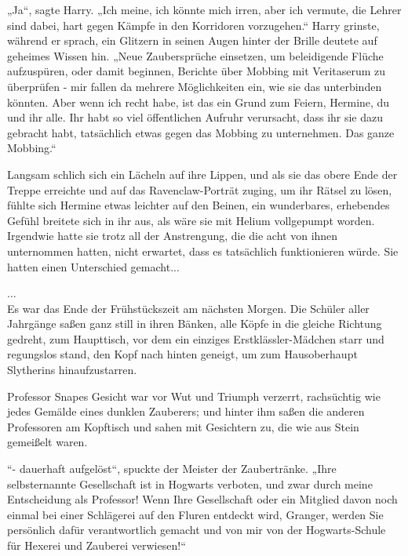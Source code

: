 {„Ja“, sagte Harry. „Ich meine, ich könnte mich irren, aber ich vermute, die Lehrer sind dabei, hart gegen Kämpfe in den Korridoren vorzugehen.“ Harry grinste, während er sprach, ein Glitzern in seinen Augen hinter der Brille deutete auf geheimes Wissen hin. „Neue Zaubersprüche einsetzen, um beleidigende Flüche aufzuspüren, oder damit beginnen, Berichte über Mobbing mit Veritaserum zu überprüfen - mir fallen da mehrere Möglichkeiten ein, wie sie das unterbinden könnten. Aber wenn ich recht habe, ist das ein Grund zum Feiern, Hermine, du und ihr alle. Ihr habt so viel öffentlichen Aufruhr verursacht, dass ihr sie dazu gebracht habt, tatsächlich etwas gegen das Mobbing zu unternehmen. Das ganze Mobbing.“

Langsam schlich sich ein Lächeln auf ihre Lippen, und als sie das obere Ende der Treppe erreichte und auf das Ravenclaw-Porträt zuging, um ihr Rätsel zu lösen, fühlte sich Hermine etwas leichter auf den Beinen, ein wunderbares, erhebendes Gefühl breitete sich in ihr aus, als wäre sie mit Helium vollgepumpt worden. Irgendwie hatte sie trotz all der Anstrengung, die die acht von ihnen unternommen hatten, nicht erwartet, dass es tatsächlich funktionieren würde. Sie hatten einen Unterschied gemacht...

...\\ Es war das Ende der Frühstückszeit am nächsten Morgen. Die Schüler aller Jahrgänge saßen ganz still in ihren Bänken, alle Köpfe in die gleiche Richtung gedreht, zum Haupttisch, vor dem ein einziges Erstklässler-Mädchen starr und regungslos stand, den Kopf nach hinten geneigt, um zum Hausoberhaupt Slytherins hinaufzustarren.

Professor Snapes Gesicht war vor Wut und Triumph verzerrt, rachsüchtig wie jedes Gemälde eines dunklen Zauberers; und hinter ihm saßen die anderen Professoren am Kopftisch und sahen mit Gesichtern zu, die wie aus Stein gemeißelt waren.

“- dauerhaft aufgelöst“, spuckte der Meister der Zaubertränke. „Ihre selbsternannte Gesellschaft ist in Hogwarts verboten, und zwar durch meine Entscheidung als Professor! Wenn Ihre Gesellschaft oder ein Mitglied davon noch einmal bei einer Schlägerei auf den Fluren entdeckt wird, Granger, werden Sie persönlich dafür verantwortlich gemacht und von mir von der Hogwarts-Schule für Hexerei und Zauberei verwiesen!“

}
